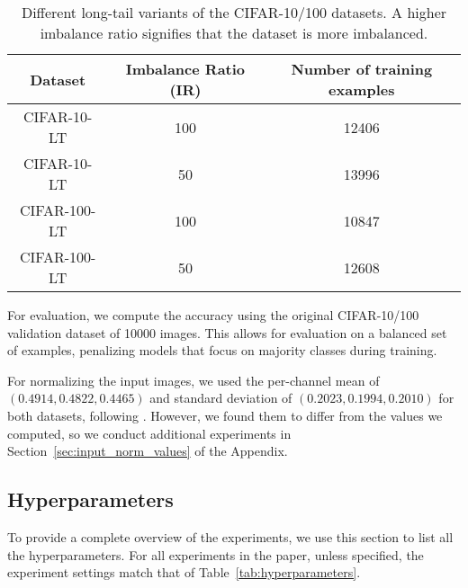 \begin{table}[!ht]
    \centering
    \begin{tabular}{c|cc}
        Dataset & Imbalance Ratio (IR) & Number of training examples \\ \hline
        CIFAR-10-LT & 100 & 12406 \\
        CIFAR-10-LT & 50 & 13996 \\
        CIFAR-100-LT & 100 & 10847 \\
        CIFAR-100-LT & 50 & 12608 \\
    \end{tabular}
    \caption{Different long-tail variants of the CIFAR-10/100 datasets. A higher imbalance ratio signifies that the dataset is more imbalanced.}
    \label{tab:longtail_datasets}
\end{table}

For evaluation, we compute the accuracy using the original CIFAR-10/100 validation dataset of 10000 images. This allows for evaluation on a balanced set of examples, penalizing models that focus on majority classes during training.

For normalizing the input images, we used the per-channel mean of $(0.4914, 0.4822, 0.4465)$ and standard deviation of $(0.2023, 0.1994, 0.2010)$ for both datasets, following \citet{MiSLAS, LDAM-DRW}. However, we found them to differ from the values we computed, so we conduct additional experiments in Section~\ref{sec:input_norm_values} of the Appendix.



\subsection{Hyperparameters}
\label{sec:hyperparameters}

To provide a complete overview of the experiments, we use this section to list all the hyperparameters. For all experiments in the paper, unless specified, the experiment settings match that of Table~\ref{tab:hyperparameters}.

